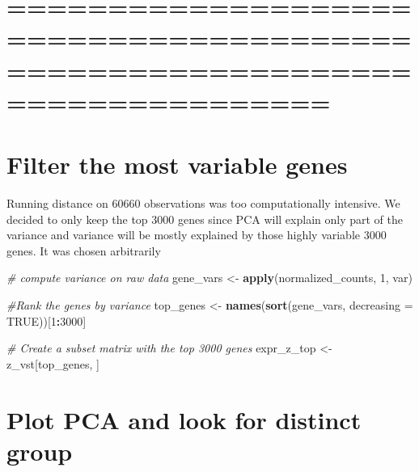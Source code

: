\documentclass[
]{article}
\newenvironment{Shaded}{\begin{snugshade}}{\end{snugshade}}
\newcommand{\AttributeTok}[1]{\textcolor[rgb]{0.13,0.29,0.53}{#1}}
\newcommand{\CommentTok}[1]{\textcolor[rgb]{0.56,0.35,0.01}{\textit{#1}}}
\newcommand{\ConstantTok}[1]{\textcolor[rgb]{0.56,0.35,0.01}{#1}}
\newcommand{\DecValTok}[1]{\textcolor[rgb]{0.00,0.00,0.81}{#1}}
\newcommand{\FunctionTok}[1]{\textcolor[rgb]{0.13,0.29,0.53}{\textbf{#1}}}
\newcommand{\NormalTok}[1]{#1}
\newcommand{\OtherTok}[1]{\textcolor[rgb]{0.56,0.35,0.01}{#1}}
\newcommand{\SpecialCharTok}[1]{\textcolor[rgb]{0.81,0.36,0.00}{\textbf{#1}}}
\begin{document}
\section{============================================================================}\label{section-8}

\section{Filter the most variable
genes}\label{filter-the-most-variable-genes}

Running distance on 60660 observations was too computationally
intensive. We decided to only keep the top 3000 genes since PCA will
explain only part of the variance and variance will be mostly explained
by those highly variable 3000 genes. It was chosen arbitrarily

\begin{Shaded}
\begin{Highlighting}[]
\CommentTok{\# compute variance on raw data}
\NormalTok{gene\_vars }\OtherTok{\textless{}{-}} \FunctionTok{apply}\NormalTok{(normalized\_counts, }\DecValTok{1}\NormalTok{, var)}


\CommentTok{\#Rank the genes by variance}
\NormalTok{top\_genes }\OtherTok{\textless{}{-}} \FunctionTok{names}\NormalTok{(}\FunctionTok{sort}\NormalTok{(gene\_vars, }\AttributeTok{decreasing =} \ConstantTok{TRUE}\NormalTok{))[}\DecValTok{1}\SpecialCharTok{:}\DecValTok{3000}\NormalTok{]}

\CommentTok{\# Create a subset matrix with the top 3000 genes}
\NormalTok{expr\_z\_top }\OtherTok{\textless{}{-}}\NormalTok{ z\_vst[top\_genes, ]}
\end{Highlighting}
\end{Shaded}

\section{Plot PCA and look for distinct
group}\label{plot-pca-and-look-for-distinct-group}
\end{document}
